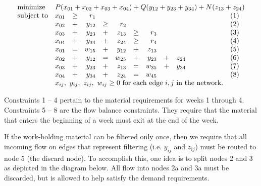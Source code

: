 \begin{enumerate}
\begin{solution}
\[
\begin{array}{lrrrrrrrrll}
\textrm{minimize} & \multicolumn{10}{r}{P(x_{01} + x_{02} + x_{03} + x_{04}) + Q(y_{12}+y_{23}+y_{34}) +N(z_{13}+z_{24})} \\
\textrm{subject to} & x_{01} & \geq & r_1 &&&&&&&(1)\\
& x_{02}&+&y_{12}&\geq&r_2&&&&&(2)\\
& x_{03}&+&y_{23}&+&z_{13}&\geq&r_3&&&(3)\\
& x_{04}&+&y_{34}&+&z_{24}&\geq&r_4&&&(4)\\
& x_{01}&=&w_{15}&+&y_{12}&+&z_{13}&&&(5)\\
& x_{02}&+&y_{12}&=&w_{25}&+&y_{23}&+&z_{24}&(6) \\
& x_{03}&+&y_{23}&+&z_{13}&=&w_{35}&+&y_{34}&(7) \\
& x_{04}&+&y_{34}&+&z_{24}&=&w_{45}&&&(8)\\
& \multicolumn{9}{r}{x_{ij},~y_{ij},~z_{ij},~w_{ij} \geq 0~\text{for each edge $i,j$ in the network.}}
\end{array}
\]

Constraints 1 -- 4 pertain to the material requirements for weeks 1
through 4.  Constraints 5 -- 8 are the flow balance constraints. They
require that the material that enters the beginning of a week must
exit at the end of the week.

If the work-holding material can be filtered only once, then we 
require that all incoming flow on edges that represent filtering (i.e. $y_{ij}$ and
$z_{ij}$) must be routed to node 5 (the discard node). To accomplish this, one idea
is to split nodes 2 and 3 as depicted in the diagram below. All flow into nodes 2a
and 3a must be discarded, but is allowed to help satisfy the demand requirements.

\begin{center}
\end{center}
\end{solution}
\end{enumerate}
